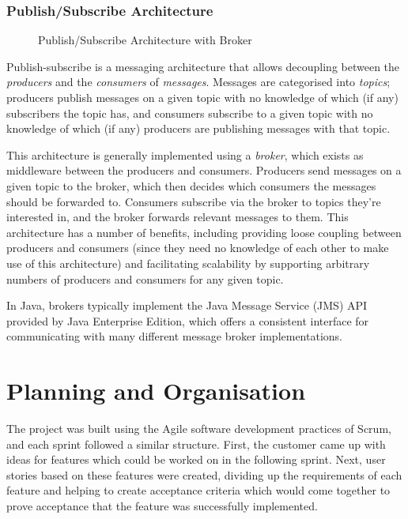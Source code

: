 \documentclass[a4paper, 12pt]{article}
\begin{document}
\newpage

\subsubsection{Publish/Subscribe Architecture}

\begin{figure}
\begin{center}
\def\svgwidth{\columnwidth}

\end{center}
\caption{Publish/Subscribe Architecture with Broker}
\label{fig:example_net}
\end{figure}

Publish-subscribe is a messaging architecture that allows decoupling between the \emph{producers} and the \emph{consumers} of \emph{messages}. Messages are categorised into \emph{topics}; producers publish messages on a given topic with no knowledge of which (if any) subscribers the topic has, and consumers subscribe to a given topic with no knowledge of which (if any) producers are publishing messages with that topic.

This architecture is generally implemented using a \emph{broker}, which exists as middleware between the producers and consumers. Producers send messages on a given topic to the broker, which then decides which consumers the messages should be forwarded to. Consumers subscribe via the broker to topics they’re interested in, and the broker forwards relevant messages to them. This architecture has a number of benefits, including providing loose coupling between producers and consumers (since they need no knowledge of each other to make use of this architecture) and facilitating scalability by supporting arbitrary numbers of producers and consumers for any given topic.

In Java, brokers typically implement the Java Message Service (JMS) API provided by Java Enterprise Edition, which offers a consistent interface for communicating with many different message broker implementations.

\newpage

\section{Planning and Organisation}
\label{sec:planning}

The project was built using the Agile software development practices of Scrum, and each sprint followed a similar structure. First, the customer came up with ideas for features which could be worked on in the following sprint. Next, user stories based on these features were created, dividing up the requirements of each feature and helping to create acceptance criteria which would come together to prove acceptance that the feature was successfully implemented.
\end{document}
